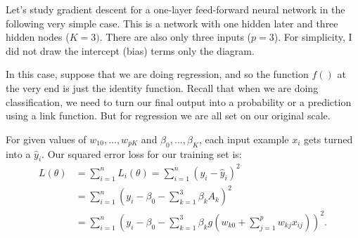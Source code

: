 Let's study gradient descent for a one-layer feed-forward neural network in the following very simple case. This is a network with one hidden later and three hidden nodes ($K=3)$. There are also only three inputs ($p=3$). For simplicity, I did not draw the intercept (bias) terms only the diagram.

\begin{center}
\end{center}

In this case, suppose that we are doing regression, and so the function $f()$ at the very end is just the identity function. Recall that when we are doing classification, we need to turn our final output into a probability or a prediction using a link function. But for regression we are all set on our original scale. 

For given values of $w_{10},\ldots, w_{pK}$ and $\beta_0,\ldots, \beta_K$, each input example $x_i$ gets turned into a $\hat{y}_i$. Our squared error loss for our training set is: 
\begin{align*}
L(\theta) &= \sum_{i=1}^n L_i(\theta) = \sum_{i=1}^n (y_i - \hat{y}_i)^2 \\
&= \sum_{i=1}^n \left( y_i - \beta_0 - \sum_{k=1}^3 \beta_k A_k \right)^2 \\
&= \sum_{i=1}^n \left( y_i - \beta_0 - \sum_{k=1}^3 \beta_k g \left(w_{k0} + \sum_{j=1}^p w_{kj} x_{ij}\right)\right)^2. 
\end{align*}

